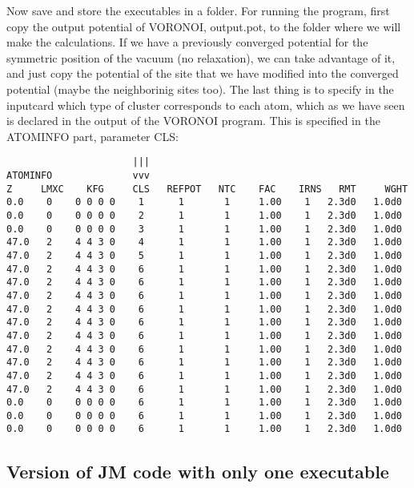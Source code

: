 \documentclass[11pt,fleqn]{book} %
\begin{document}
Now save and store the executables in a folder. For running the
program, first copy the output potential of VORONOI, output.pot,
to the folder where we will make the calculations. If we have a previously converged
potential for the symmetric position of the vacuum (no relaxation),
we can take advantage of it, and just copy the potential of the site that
we have modified into the converged potential (maybe the neighborinig sites too).
The last thing is to specify in the inputcard which type of cluster corresponds to
each atom, which as we have seen is declared in the output of the VORONOI program.
This is specified in the ATOMINFO part, parameter CLS:
\begin{VBox}
{\small{
\begin{verbatim}                      |||
ATOMINFO              vvv
Z     LMXC    KFG     CLS   REFPOT   NTC    FAC    IRNS   RMT     WGHT
0.0    0    0 0 0 0    1      1       1     1.00    1   2.3d0   1.0d0
0.0    0    0 0 0 0    2      1       1     1.00    1   2.3d0   1.0d0
0.0    0    0 0 0 0    3      1       1     1.00    1   2.3d0   1.0d0
47.0   2    4 4 3 0    4      1       1     1.00    1   2.3d0   1.0d0
47.0   2    4 4 3 0    5      1       1     1.00    1   2.3d0   1.0d0
47.0   2    4 4 3 0    6      1       1     1.00    1   2.3d0   1.0d0
47.0   2    4 4 3 0    6      1       1     1.00    1   2.3d0   1.0d0
47.0   2    4 4 3 0    6      1       1     1.00    1   2.3d0   1.0d0
47.0   2    4 4 3 0    6      1       1     1.00    1   2.3d0   1.0d0
47.0   2    4 4 3 0    6      1       1     1.00    1   2.3d0   1.0d0
47.0   2    4 4 3 0    6      1       1     1.00    1   2.3d0   1.0d0
47.0   2    4 4 3 0    6      1       1     1.00    1   2.3d0   1.0d0
47.0   2    4 4 3 0    6      1       1     1.00    1   2.3d0   1.0d0
47.0   2    4 4 3 0    6      1       1     1.00    1   2.3d0   1.0d0
47.0   2    4 4 3 0    6      1       1     1.00    1   2.3d0   1.0d0
0.0    0    0 0 0 0    6      1       1     1.00    1   2.3d0   1.0d0
0.0    0    0 0 0 0    6      1       1     1.00    1   2.3d0   1.0d0
0.0    0    0 0 0 0    6      1       1     1.00    1   2.3d0   1.0d0
\end{verbatim}
}}
\end{VBox}

\subsection{Version of JM code with only one executable}
\end{document}
